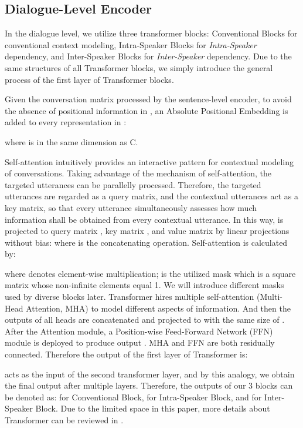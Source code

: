 \documentclass[letterpaper]{article} \usepackage{aaai21}  \usepackage{times}  \usepackage{helvet} \usepackage{courier}  \usepackage[hyphens]{url}  \usepackage{graphicx} \urlstyle{rm} \def\UrlFont{\rm}  \usepackage{natbib}  \usepackage{caption} \usepackage{multirow}
\begin{document}
\subsection{Dialogue-Level Encoder} \label{sec: 3.2.2}



In the dialogue level, we utilize three transformer blocks: Conventional Blocks for conventional context modeling, Intra-Speaker Blocks for \emph{Intra-Speaker} dependency, and Inter-Speaker Blocks for \emph{Inter-Speaker} dependency. Due to the same structures of all Transformer blocks, we simply introduce the general process of the first layer of Transformer blocks. 

Given the conversation matrix  processed by the sentence-level encoder, to avoid the absence of positional information in , an Absolute Positional Embedding is added to every representation in :

where  is in the same dimension as C. 

Self-attention intuitively provides an interactive pattern for contextual modeling of conversations. Taking advantage of the mechanism of self-attention, the targeted utterances can be parallelly processed. Therefore, the targeted utterances are regarded as a query matrix, and the contextual utterances act as a key matrix, so that every utterance simultaneously assesses how much information shall be obtained from every contextual utterance. In this way,  is projected to query matrix , key matrix , and value matrix  by linear projections without bias:  where  is the concatenating operation. Self-attention is calculated by: 

where  denotes element-wise multiplication;  is the utilized mask which is a square matrix whose non-infinite elements equal 1. We will introduce different masks used by diverse blocks later. Transformer hires multiple self-attention (Multi-Head Attention, MHA) to model different aspects of information. And then the outputs of all heads are concatenated and projected to  with the same size of . After the Attention module, a Position-wise Feed-Forward Network (FFN) module is deployed to produce output . MHA and FFN are both residually connected. Therefore the output  of the first layer of Transformer is:


 acts as the input of the second transformer layer, and by this analogy, we obtain the final output  after multiple layers. Therefore, the outputs of our 3 blocks can be denoted as:  for Conventional Block,  for Intra-Speaker Block, and  for Inter-Speaker Block. Due to the limited space in this paper, more details about Transformer can be reviewed in \citet{Transformer}. 
\end{document}

